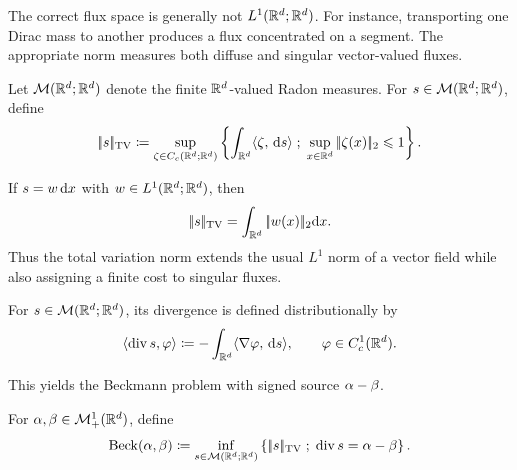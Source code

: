 The correct flux space is generally not $L^1(\mathbb{R}^d;\mathbb{R}^d)$. For instance, transporting one Dirac mass to another produces a flux concentrated on a segment. The appropriate norm measures both diffuse and singular vector-valued fluxes.

\begin{defn}\label{def-vector-measure-tv}
	Let $\mathcal{M}(\mathbb{R}^d;\mathbb{R}^d)$ denote the finite $\mathbb{R}^d$-valued Radon measures. For $s\in\mathcal{M}(\mathbb{R}^d;\mathbb{R}^d)$, define
	\[
		|\!| s |\!|_{\operatorname{TV}}
		\coloneqq
		\sup_{\zeta\in C_c(\mathbb{R}^d;\mathbb{R}^d)}
		\left\{ \int_{\mathbb{R}^d}\langle \zeta,\,\mathrm{d}s\rangle \;;\; \sup_{x\in\mathbb{R}^d}|\!| \zeta(x) |\!|_2\leqslant1 \right\}.
	\]
\end{defn}

\begin{rem}\label{rem-vector-measure-tv-density}
	If $s=w\,\mathrm{d} x$ with $w\in L^1(\mathbb{R}^d;\mathbb{R}^d)$, then
	\[
		|\!| s |\!|_{\operatorname{TV}}
		=
		\int_{\mathbb{R}^d}|\!| w(x) |\!|_2\mathrm{d} x.
	\]
	Thus the total variation norm extends the usual $L^1$ norm of a vector field while also assigning a finite cost to singular fluxes.
\end{rem}

For $s\in\mathcal{M}(\mathbb{R}^d;\mathbb{R}^d)$, its divergence is defined distributionally by
\[
	\langle\operatorname{div}s,\varphi\rangle
	\coloneqq
	-\int_{\mathbb{R}^d}\langle \nabla\varphi,\,\mathrm{d}s\rangle,
	\qquad \varphi\in C_c^1(\mathbb{R}^d).
\]

This yields the Beckmann problem with signed source $\alpha-\beta$.
\begin{defn}\label{def-beckmann-problem}
For $\alpha,\beta\in\mathcal{M}_+^1(\mathbb{R}^d)$, define
\[
    \operatorname{Beck}(\alpha,\beta)
    \coloneqq
    \inf_{s\in\mathcal{M}(\mathbb{R}^d;\mathbb{R}^d)}
    \left\{ |\!| s |\!|_{\operatorname{TV}} \;;\; \operatorname{div}s=\alpha-\beta \right\}.
\]
\end{defn}

